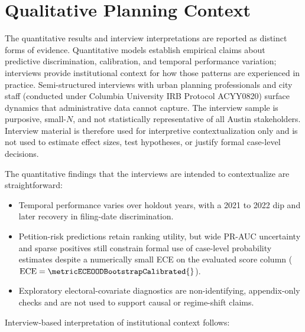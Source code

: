 \documentclass[11pt, letterpaper, oneside]{article}
\begin{document}
\section{Qualitative Planning Context}
\label{sec:interviews}

The quantitative results and interview interpretations are reported as distinct forms of evidence. Quantitative models establish empirical claims about predictive discrimination, calibration, and temporal performance variation; interviews provide institutional context for how those patterns are experienced in practice. Semi-structured interviews with urban planning professionals and city staff (conducted under Columbia University IRB Protocol ACYY0820) surface dynamics that administrative data cannot capture. The interview sample is purposive, small-$N$, and not statistically representative of all Austin stakeholders. Interview material is therefore used for interpretive contextualization only and is not used to estimate effect sizes, test hypotheses, or justify formal case-level decisions.

The quantitative findings that the interviews are intended to contextualize are straightforward:
\begin{itemize}
    \item Temporal performance varies over holdout years, with a 2021 to 2022 dip and later recovery in filing-date discrimination.
    \item Petition-risk predictions retain ranking utility, but wide PR-AUC uncertainty and sparse positives still constrain formal use of case-level probability estimates despite a numerically small ECE on the evaluated score column ($\text{ECE}=\metricECEOODBootstrapCalibrated{}$).
    \item Exploratory electoral-covariate diagnostics are non-identifying, appendix-only checks and are not used to support causal or regime-shift claims.
\end{itemize}

Interview-based interpretation of institutional context follows:
\end{document}

